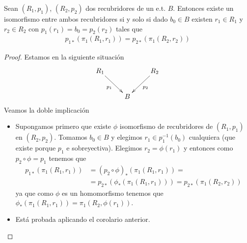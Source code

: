 \begin{teo}
    Sean $(R_1, p_1)$, $(R_2, p_2)$ dos recubridores de un e.t. $B$. Entonces existe un isomorfismo entre ambos recubridores si y solo si dado $b_0\in B$ existen $r_1\in R_1$ y $r_2 \in R_2$ con $p_1(r_1) = b_0 = p_2(r_2)$ tales que 
    \begin{gather*}
        p_{1*}(\pi_1(R_1,r_1)) = p_{2*}(\pi_1(R_2,r_2))
    \end{gather*}
    \begin{proof}
        Estamos en la siguiente situación
        \begin{gather*}
            \xymatrix{
                R_1 \ar[dr]_{p_1} && R_2 \ar[dl]^{p_2}\\
                & B
            }
        \end{gather*}
        Veamos la doble implicación
        \begin{itemize}
            \item[$\Rightarrow$)] Supongamos primero que existe $\phi$ isomorfismo de recubridores de $(R_1, p_1)$ en $(R_2, p_2)$. Tomamos $b_0\in B$ y elegimos $r_1\in p_1^{-1}(b_0)$ cualquiera (que existe porque $p_1$ e sobreyectiva). Elegimos $r_2 = \phi(r_1)$ y entonces como $p_2\circ \phi = p_1$ tenemos que 
            \begin{align*}
                p_{1*}(\pi_1(R_1,r_1)) &= (p_2\circ \phi)_*(\pi_1(R_1, r_1)) = \\
                &= p_{2*}(\phi_*(\pi_1(R_1,r_1))) = p_{2*}(\pi_1(R_2, r_2))
            \end{align*}
            ya que como $\phi$ es un homomorfismo tenemos que $\phi_*(\pi_1(R_1,r_1)) = \pi_1(R_2, \phi(r_1))$.

            \item[$\Leftarrow$)] Está probada aplicando el corolario anterior.
        \end{itemize}
    \end{proof}
\end{teo}

